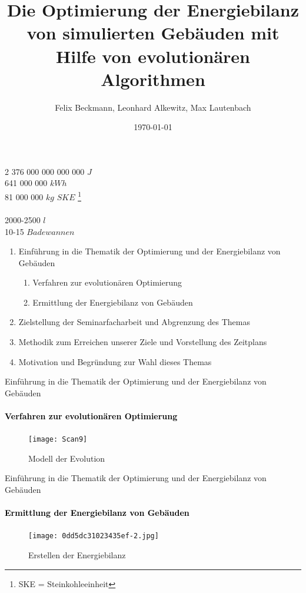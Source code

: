 \documentclass[11pt]{beamer}
\author{Felix Beckmann, Leonhard Alkewitz, Max Lautenbach}
\title{Die Optimierung der Energiebilanz von simulierten Gebäuden mit Hilfe von evolutionären Algorithmen}
\institute{Spezialschulteil des Albert-Schweizer Gymnasium Erfurt}
\date{\today}
\begin{document}
\begin{frame}

\end{frame}

\begin{frame}
\begin{center}
\huge{2 376 000 000 000 000 $J$}  \\  
\pause \huge{641 000 000 $kWh$} \\ 
\pause \huge{81 000 000 $kg$ $SKE$ \footnote{SKE = Steinkohleeinheit}} \\ 
\hrulefill{}  \\
\pause \huge{2000-2500 $l$} \\ 
\pause \huge{10-15 $Badewannen$}
\end{center}
\end{frame}

\begin{frame}
\titlepage
\end{frame}

\begin{frame}
\begin{enumerate}
\item{Einführung in die Thematik der Optimierung und der Energiebilanz von Gebäuden}
\begin{enumerate}
\item{Verfahren zur evolutionären Optimierung}
\item{Ermittlung der Energiebilanz von Gebäuden}
\end{enumerate}
\item{Zielstellung der Seminarfacharbeit und Abgrenzung des Themas}
\item{Methodik zum Erreichen unserer Ziele und Vorstellung des Zeitplans}
\item{Motivation und Begründung zur Wahl dieses Themas}
\end{enumerate}
\end{frame}

\begin{frame}{Einführung in die Thematik der Optimierung und der Energiebilanz von Gebäuden}
\framesubtitle{\large{\textcolor{black}{Verfahren zur evolutionären Optimierung}}}
\begin{figure}
\texttt{[image: Scan9]}
\caption{Modell der Evolution}
\end{figure}
\end{frame}

\begin{frame}{Einführung in die Thematik der Optimierung und der Energiebilanz von Gebäuden}
\framesubtitle{\large{\textcolor{black}{Ermittlung der Energiebilanz von Gebäuden}}}
\begin{figure}
\texttt{[image: 0dd5dc31023435ef-2.jpg]} 
\caption{Erstellen der Energiebilanz}
\end{figure}
\end{frame}
\end{document}
